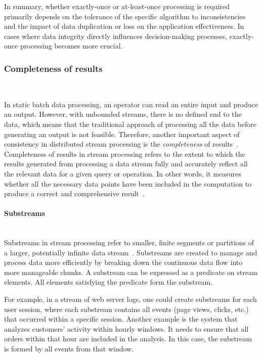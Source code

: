 In summary, whether exactly-once or at-least-once processing is required primarily depends on the tolerance of the specific algorithm to inconsistencies and the impact of data duplication or loss on the application effectiveness. In cases where data integrity directly influences decision-making processes, exactly-once processing becomes more crucial.

\subsubsection{Completeness of results}\mbox{} \\
\label{completeness}

In static batch data processing, an operator can read an entire input and produce an output. However, with unbounded streams, there is no defined end to the data, which means that the traditional approach of processing all the data before generating an output is not feasible. Therefore, another important aspect of consistency in distributed stream processing is the {\em completeness} of results~\cite{Tucker:2003:EPS:776752.776780}. Completeness of results in stream processing refers to the extent to which the results generated from processing a data stream fully and accurately reflect all the relevant data for a given query or operation. In other words, it measures whether all the necessary data points have been included in the computation to produce a correct and comprehensive result~\cite{akidau2015streaming}.

\paragraph{Substreams}\mbox{} \\

Substreams in stream processing refer to smaller, finite segments or partitions of a larger, potentially infinite data stream~\cite{Tucker:2003:EPS:776752.776780}. Substreams are created to manage and process data more efficiently by breaking down the continuous data flow into more manageable chunks. A substream can be expressed as a predicate on stream elements. All elements satisfying the predicate form the substream.

For example, in a stream of web server logs, one could create substreams for each user session, where each substream contains all events (page views, clicks, etc.) that occurred within a specific session. Another example is the system that analyzes customers' activity within hourly windows. It needs to ensure that all orders within that hour are included in the analysis. In this case, the substream is formed by all events from that window.

